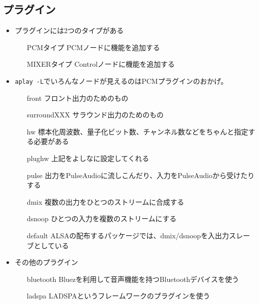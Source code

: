 \documentclass[mingoth,a4paper]{jsarticle}
\begin{document}
\subsection{プラグイン}
\begin{itemize}
\item プラグインには2つのタイプがある
  \begin{itemize}
  \item[PCMタイプ] PCMノードに機能を追加する
  \item[MIXERタイプ] Controlノードに機能を追加する
  \end{itemize}
\item {\tt aplay -L}でいろんなノードが見えるのはPCMプラグインのおかげ。
  \begin{itemize}
  \item[front] フロント出力のためのもの
  \item[surroundXXX] サラウンド出力のためのもの
  \item[hw] 標本化周波数、量子化ビット数、チャンネル数などをちゃんと指定する必要がある
  \item[plughw] 上記をよしなに設定してくれる
  \item[pulse] 出力をPulseAudioに流しこんだり、入力をPulseAudioから受けたりする
  \item[dmix] 複数の出力をひとつのストリームに合成する
  \item[dsnoop] ひとつの入力を複数のストリームにする
  \item[default] ALSAの配布するパッケージでは、dmix/dsnoopを入出力スレーブとしている
  \end{itemize}
\item その他のプラグイン
  \begin{itemize}
  \item[bluetooth] Bluezを利用して音声機能を持つBluetoothデバイスを使う
  \item[ladspa] LADSPAというフレームワークのプラグインを使う
  \end{itemize}
\end{itemize}
\end{document}
